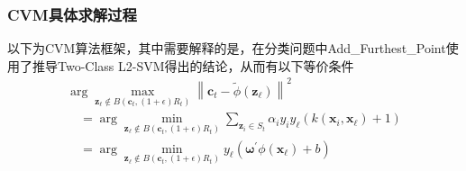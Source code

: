 \documentclass[UTF8, fleqn,10pt]{SelfArx} %
\begin{document}
		\subsubsection{CVM具体求解过程}
		以下为CVM算法框架，其中需要解释的是，在分类问题中Add\_Furthest\_Point使用了推导Two-Class L2-SVM得出的结论，从而有以下等价条件
		$$
		\begin{array}{l}\arg \max _{\mathbf{z_\ell} \notin B\left(\mathbf{c}_{t},(1+\epsilon) R_{t}\right)}\left\|\mathbf{c}_{t}-\tilde{\phi}\left(\mathbf{z}_{\ell}\right)\right\|^{2} \\ \quad=\arg \min _{\mathbf{z}_{\ell} \notin B\left(\mathbf{c}_{t},(1+\epsilon) R_{t}\right)} \sum_{\mathbf{z}_{i} \in {S}_{t}} \alpha_{i} y_{i} y_{\ell}\left(k\left(\mathbf{x}_{i}, \mathbf{x}_{\ell}\right)+1\right) \\ \quad=\arg \min _{\mathbf{z}_{\ell} \notin B\left(\mathbf{c}_{t},(1+\epsilon) R_{t}\right)} y_{\ell}\left(\mathbf{\omega}^{\prime} \phi\left(\mathbf{x}_{\ell}\right)+b\right)\end{array}
		$$
\end{document}
